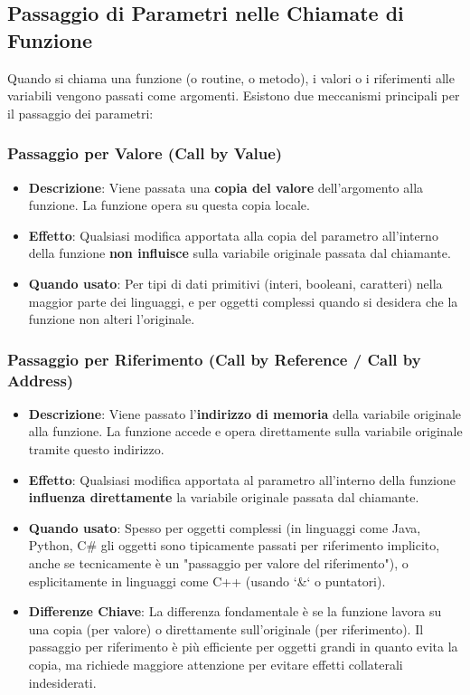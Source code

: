\subsection{Passaggio di Parametri nelle Chiamate di Funzione}
Quando si chiama una funzione (o routine, o metodo), i valori o i riferimenti alle variabili vengono passati come argomenti. Esistono due meccanismi principali per il passaggio dei parametri:

\subsubsection{Passaggio per Valore (Call by Value)}
\begin{itemize}
    \item \textbf{Descrizione}: Viene passata una \textbf{copia del valore} dell'argomento alla funzione. La funzione opera su questa copia locale.
    \item \textbf{Effetto}: Qualsiasi modifica apportata alla copia del parametro all'interno della funzione \textbf{non influisce} sulla variabile originale passata dal chiamante.
    \item \textbf{Quando usato}: Per tipi di dati primitivi (interi, booleani, caratteri) nella maggior parte dei linguaggi, e per oggetti complessi quando si desidera che la funzione non alteri l'originale.
\end{itemize}

\subsubsection{Passaggio per Riferimento (Call by Reference / Call by Address)}
\begin{itemize}
    \item \textbf{Descrizione}: Viene passato l'\textbf{indirizzo di memoria} della variabile originale alla funzione. La funzione accede e opera direttamente sulla variabile originale tramite questo indirizzo.
    \item \textbf{Effetto}: Qualsiasi modifica apportata al parametro all'interno della funzione \textbf{influenza direttamente} la variabile originale passata dal chiamante.
    \item \textbf{Quando usato}: Spesso per oggetti complessi (in linguaggi come Java, Python, C\# gli oggetti sono tipicamente passati per riferimento implicito, anche se tecnicamente è un "passaggio per valore del riferimento"), o esplicitamente in linguaggi come C++ (usando `\&` o puntatori).
\item \textbf{Differenze Chiave}: La differenza fondamentale è se la funzione lavora su una copia (per valore) o direttamente sull'originale (per riferimento). Il passaggio per riferimento è più efficiente per oggetti grandi in quanto evita la copia, ma richiede maggiore attenzione per evitare effetti collaterali indesiderati.
\end{itemize}


